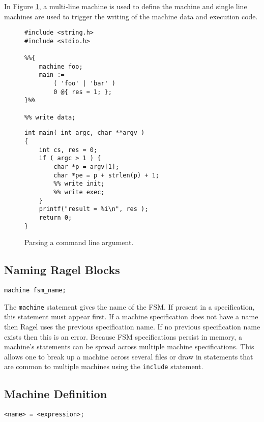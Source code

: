 \documentclass[letterpaper,11pt,oneside]{book}
\newcommand{\verbspace}{\vspace{10pt}}
\begin{document}
In Figure \ref{cmd-line-parsing}, a multi-line machine is used to define the
machine and single line machines are used to trigger the writing of the machine
data and execution code.

\begin{figure}
\begin{multicols}{2}
\small
\begin{verbatim}
#include <string.h>
#include <stdio.h>

%%{ 
    machine foo;
    main := 
        ( 'foo' | 'bar' ) 
        0 @{ res = 1; };
}%%

%% write data;
\end{verbatim}
\columnbreak
\begin{verbatim}
int main( int argc, char **argv )
{
    int cs, res = 0;
    if ( argc > 1 ) {
        char *p = argv[1];
        char *pe = p + strlen(p) + 1;
        %% write init;
        %% write exec;
    }
    printf("result = %i\n", res );
    return 0;
}
\end{verbatim}
\end{multicols}
\caption{Parsing a command line argument.}
\label{cmd-line-parsing}
\end{figure}


\subsection{Naming Ragel Blocks}

\begin{verbatim}
machine fsm_name;
\end{verbatim}
\verbspace

The \verb|machine| statement gives the name of the FSM. If present in a
specification, this statement must appear first. If a machine specification
does not have a name then Ragel uses the previous specification name.  If no
previous specification name exists then this is an error. Because FSM
specifications persist in memory, a machine's statements can be spread across
multiple machine specifications.  This allows one to break up a machine across
several files or draw in statements that are common to multiple machines using
the \verb|include| statement.

\subsection{Machine Definition}
\label{definition}

\begin{verbatim}
<name> = <expression>;
\end{verbatim}
\verbspace
\end{document}
